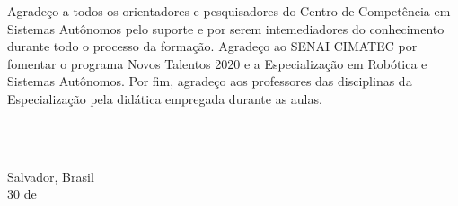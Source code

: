 \begin{agradecimentos}

Agradeço a todos os orientadores e pesquisadores do Centro de Competência em Sistemas Autônomos pelo suporte e por serem intemediadores do conhecimento durante todo o processo da formação. Agradeço ao SENAI CIMATEC por fomentar o programa Novos Talentos 2020 e a Especialização em Robótica e Sistemas Autônomos. Por fim, agradeço aos professores das disciplinas da Especialização pela didática empregada durante as aulas.




\ \\
\ \\

\noindent

\raggedright
Salvador, Brasil \\ 
30 de \mesdeano \\

\raggedleft
\theauthor\\

\end{agradecimentos}
